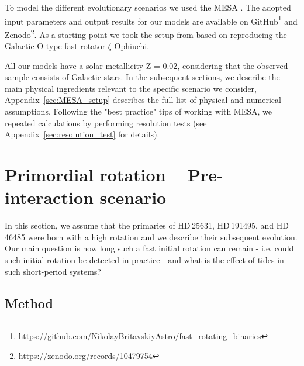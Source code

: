 \documentclass{aa}
\DeclareRobustCommand{\Appref}[1]{Appendix~\ref{#1}}
\begin{document}
To model the different evolutionary scenarios we used the MESA
\citep[Modules for Experiments in Stellar Astrophysics, version
15140][]{Paxton2011, Paxton2013, Paxton2015, Paxton2018, Paxton2019,
  Jermyn2023}. The adopted input parameters and output results for our
models are available on GitHub\footnote{\url{https://github.com/NikolayBritavskiyAstro/fast_rotating_binaries}} and Zenodo\footnote{\url{https://zenodo.org/records/10479754}}. As a
starting point we took the setup from \citet{Renzo_2021} based
  on reproducing the Galactic O-type fast rotator $\zeta$ Ophiuchi.

All our models have a solar metallicity Z = 0.02, considering that the observed sample consists of
Galactic stars. In the subsequent sections, we describe the main
physical ingredients relevant to the specific scenario we consider,
\Appref{sec:MESA_setup} describes the full list of physical and
numerical assumptions. Following the "best practice" tips of working with MESA, we repeated calculations by performing resolution tests (see \Appref{sec:resolution_test} for details).


\section{Primordial rotation -- Pre-interaction scenario}
\label{sec:pre-interaction}

In this section, we assume that the primaries of HD\,25631, HD\,191495, and HD\,46485 were
born with a high rotation and we describe their subsequent
evolution.
Our main question is how long such a fast initial rotation can remain - i.e. could such initial rotation be detected in practice -  and what is the effect of tides in such short-period systems?


\subsection{Method}
\end{document}
